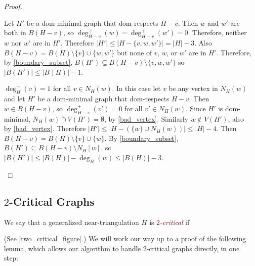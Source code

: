 \documentclass[12pt]{article}
\newcommand{\defin}[1]{\emph{\textcolor{Maroon}{#1}}}
\theoremstyle{definition}
\begin{document}
\begin{proof}
\begin{compactenum}[(a)]
    Let $H'$ be a dom-minimal graph that dom-respects $H-v$. Then $w$ and $w'$ are both in $B(H-v)$, so $\deg^+_{H-v}(w)=\deg^+_{H-v}(w')=0$. Therefore, neither $w$ nor $w'$ are in $H'$. Therefore $|H'|\le |H-\{v,w,w'\}|=|H|-3$.  Also $B(H-v)=B(H)\setminus\{v\}\cup\{w,w'\}$ but none of $v$, $w$, or $w'$ are in $H'$.  Therefore, by \cref{boundary_subset}, $B(H')\subseteq B(H-v)\setminus\{v,w,w'\}$ so $|B(H')|\le |B(H)|-1$.

    \item $\deg^+_H(v)=1$ for all $v\in N_H(w)$.  In this case let $v$ be any vertex in $N_H(w)$ and let $H'$ be a dom-minimal graph that dom-respects $H-v$.  Then $w\in B(H-v)$, so $\deg^+_{H-v}(v')=0$ for all $v'\in N_H(w)$. Since $H'$ is dom-minimal, $N_H(w)\cap V(H')=\emptyset$, by \cref{bad_vertex}.  Similarly $w\not\in V(H')$, also by \cref{bad_vertex}. Therefore $|H'|\le |H-(\{w\}\cup N_H(w))| \le |H|-4$. Then $B(H-v)=B(H)\setminus\{v\}\cup\{w\}$.
    By \cref{boundary_subset}, $B(H')\subseteq B(H-v)\setminus N_H[w]$, so $|B(H')|\le |B(H)|-\deg_H(w) \le |B(H)|-3$. \qedhere
  \end{compactenum}
\end{proof}



\subsection{$2$-Critical Graphs}


We say that a generalized near-triangulation $H$ is \defin{$2$-critical} if
(See \cref{two_critical_figure}.) We will work our way up to a proof of the following lemma, which allows our algorithm to handle $2$-critical graphs directly, in one step:
\end{document}

